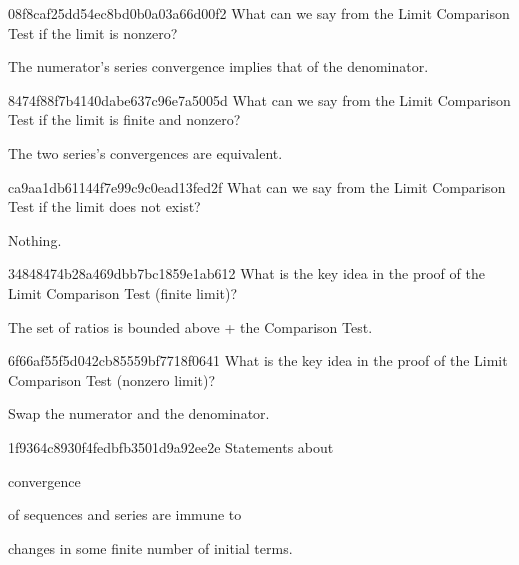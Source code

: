 \begin{note}{08f8caf25dd54ec8bd0b0a03a66d00f2}
    What can we say from the Limit Comparison Test if the limit is nonzero?

    \begin{cloze}{1}
        The numerator's series convergence implies that of the denominator.
    \end{cloze}
\end{note}

\begin{note}{8474f88f7b4140dabe637c96e7a5005d}
    What can we say from the Limit Comparison Test if the limit is finite and nonzero?

    \begin{cloze}{1}
        The two series's convergences are equivalent.
    \end{cloze}
\end{note}

\begin{note}{ca9aa1db61144f7e99c9c0ead13fed2f}
    What can we say from the Limit Comparison Test if the limit does not exist?

    \begin{cloze}{1}
        Nothing.
    \end{cloze}
\end{note}

\begin{note}{34848474b28a469dbb7bc1859e1ab612}
    What is the key idea in the proof of the Limit Comparison Test (finite limit)?

    \begin{cloze}{1}
        The set of ratios is bounded above + the Comparison Test.
    \end{cloze}
\end{note}

\begin{note}{6f66af55f5d042cb85559bf7718f0641}
    What is the key idea in the proof of the Limit Comparison Test (nonzero limit)?

    \begin{cloze}{1}
        Swap the numerator and the denominator.
    \end{cloze}
\end{note}

\begin{note}{1f9364c8930f4fedbfb3501d9a92ee2e}
    Statements about \begin{icloze}{2}convergence\end{icloze} of sequences and series are immune to \begin{icloze}{1}changes in some finite number of initial terms.\end{icloze}
\end{note}

